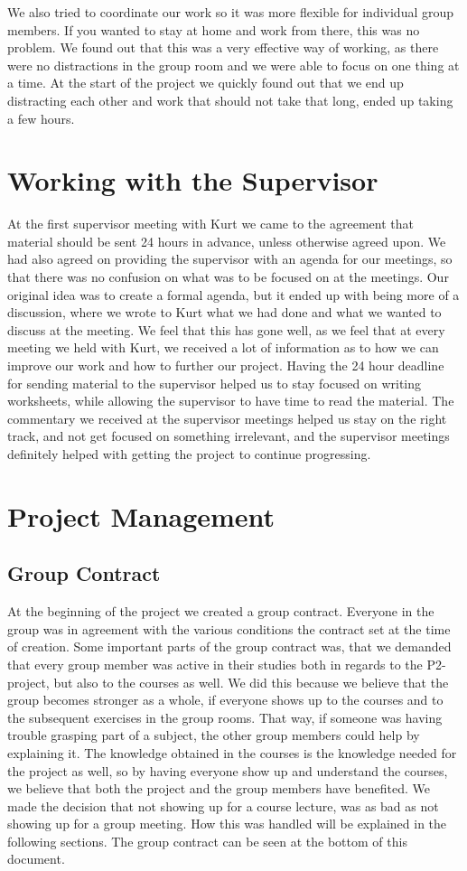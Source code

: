 We also tried to coordinate our work so it was more flexible for individual group members.
If you wanted to stay at home and work from there, this was no problem.
We found out that this was a very effective way of working, as there were no distractions in the group room and we were able to focus on one thing at a time.
At the start of the project we quickly found out that we end up distracting each other and work that should not take that long, ended up taking a few hours.

\section{Working with the Supervisor}
At the first supervisor meeting with Kurt we came to the agreement that material should be sent 24 hours in advance, unless otherwise agreed upon. 
We had also agreed on providing the supervisor with an agenda for our meetings, so that there was no confusion on what was to be focused on at the meetings. 
Our original idea was to create a formal agenda, but it ended up with being more of a discussion, where we wrote to Kurt what we had done and what we wanted to discuss at the meeting. 
We feel that this has gone well, as we feel that at every meeting we held with Kurt, we received a lot of information as to how we can improve our work and how to further our project.
Having the 24 hour deadline for sending material to the supervisor helped us to stay focused on writing worksheets, while allowing the supervisor to have time to read the material. 
The commentary we received at the supervisor meetings helped us stay on the right track, and not get focused on something irrelevant, and the supervisor meetings definitely helped with getting the project to continue progressing.
  

\section{Project Management}
\subsection{Group Contract}
At the beginning of the project we created a group contract. 
Everyone in the group was in agreement with the various conditions the contract set at the time of creation. 
Some important parts of the group contract was, that we demanded that every group member was active in their studies both in regards to the P2-project, but also to the courses as well.
We did this because we believe that the group becomes stronger as a whole, if everyone shows up to the courses and to the subsequent exercises in the group rooms. 
That way, if someone was having trouble grasping part of a subject, the other group members could help by explaining it. 
The knowledge obtained in the courses is the knowledge needed for the project as well, so by having everyone show up and understand the courses, we believe that both the project and the group members have benefited.
We made the decision that not showing up for a course lecture, was as bad as not showing up for a group meeting.
How this was handled will be explained in the following sections. 
The group contract can be seen at the bottom of this document.

